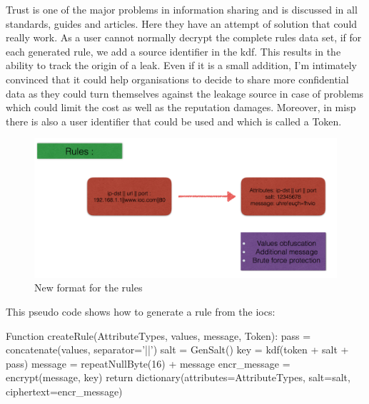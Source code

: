 \documentclass{eplmastersthesis}
\begin{document}
Trust is one of the major problems in information sharing and is discussed in all standards, guides and articles. Here they have an attempt of solution that could really work. As a user cannot normally decrypt the complete rules data set, if for each generated rule, we add a source identifier in the \gls{kdf}. This results in the ability to track the origin of a leak. 
Even if it is a small addition, I'm intimately convinced that it could help organisations to decide to share more confidential data as they could turn themselves against the leakage source in case of problems which could limit the cost as well as the reputation damages. Moreover, in \gls{misp} there is also a user identifier that could be used and which is called a Token.\\

\begin{figure}[h!]
\begin{center}
	\includegraphics[scale=0.5]{res/obfuscation-rule}
	\caption{New format for the rules}
	\label{Obfuscation-Rule}
\end{center}
\end{figure}


This pseudo code shows how to generate a rule from the \glspl{ioc}:

\begin{center}
\begin{boxedverbatim}
Function createRule(AttributeTypes, values, message, Token):
        pass = concatenate(values, separator='||')
        salt = GenSalt()
        key = kdf(token + salt + pass)
        message = repeatNullByte(16) + message
        encr_message = encrypt(message, key)
        return dictionary(attributes=AttributeTypes, 
                            salt=salt,
                            ciphertext=encr_message)
\end{boxedverbatim}
\end{center}
\end{document}
